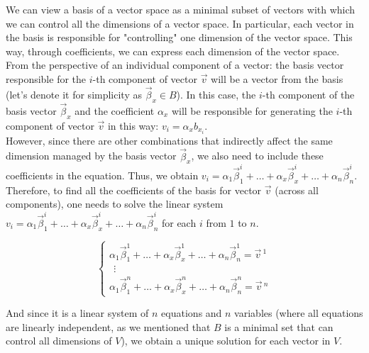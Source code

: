 We can view a basis of a vector space as a minimal subset of vectors with which we can control all the dimensions of a vector space. In particular, each vector in the basis is responsible for "controlling" one dimension of the vector space. This way, through coefficients, we can express each dimension of the vector space. From the perspective of an individual component of a vector: the basis vector responsible for the $i$-th component of vector $\vec{v}$ will be a vector from the basis (let's denote it for simplicity as $\vec{\beta}_x \in B$). In this case, the $i$-th component of the basis vector $\vec{\beta}_x$ and the coefficient $\alpha_x$ will be responsible for generating the $i$-th component of vector $\vec{v}$ in this way: $v_i = \alpha_x b_{x_i}$.
\\

However, since there are other combinations that indirectly affect the same dimension managed by the basis vector $\vec{\beta}_x$, we also need to include these coefficients in the equation. Thus, we obtain $v_i = \alpha_1 \vec\beta^i_{1} + \ldots + \alpha_x \vec{\beta}^i_{x} + \ldots + \alpha_n \vec{\beta}^i_{n}$. Therefore, to find all the coefficients of the basis for vector $\vec{v}$ (across all components), one needs to solve the linear system $v_i = \alpha_1 \vec{\beta}^i_{1} + \ldots + \alpha_x \vec{\beta}^i_{x} + \ldots + \alpha_n \vec{\beta}^i_{n}$ for each $i$ from $1$ to $n$.

$$
\begin{cases}
\alpha_1 \vec{\beta}^1_{1} + \ldots + \alpha_x \vec{\beta}^1_{x} + \ldots + \alpha_n \vec{\beta}^1_{n} = \vec v{\,}^1 \\
\ \ \vdots\\
\alpha_1 \vec{\beta}^n_{1} + \ldots + \alpha_x \vec{\beta}^n_{x} + \ldots + \alpha_n \vec{\beta}^n_{n} = \vec v{\,}^n
\end{cases}
$$

And since it is a linear system of $n$ equations and $n$ variables (where all equations are linearly independent, as we mentioned that ${B}$ is a minimal set that can control all dimensions of $V$), we obtain a unique solution for each vector in $V$.

